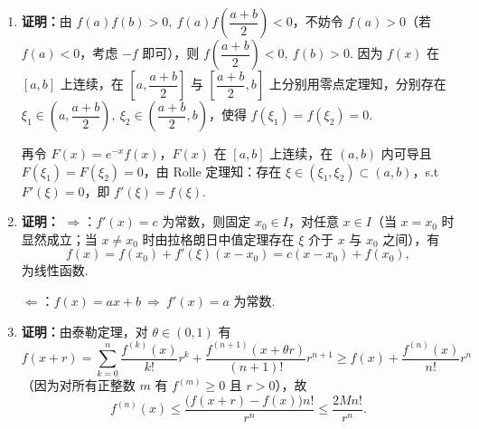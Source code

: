 \documentclass[a4paper,11pt]{ctexart}
\begin{document}
\begin{enumerate}[label=\arabic*., leftmargin=2em, itemsep=0.9em, topsep=0.4em]
  \item \textbf{证明：}由 $f(a)f(b)>0,\ f(a)f\!\left(\dfrac{a+b}{2}\right)<0$，不妨令 $f(a)>0$（若 $f(a)<0$，考虑 $-f$ 即可），则 $f\!\left(\dfrac{a+b}{2}\right)<0,\ f(b)>0$. 因为 $f(x)$ 在 $[a,b]$ 上连续，在 $\left[a,\dfrac{a+b}{2}\right]$ 与 $\left[\dfrac{a+b}{2},b\right]$ 上分别用零点定理知，分别存在 $\xi_1\in\left(a,\dfrac{a+b}{2}\right),\ \xi_2\in\left(\dfrac{a+b}{2},b\right)$，使得 $f(\xi_1)=f(\xi_2)=0$.

  再令 $F(x)=e^{-x}f(x)$，$F(x)$ 在 $[a,b]$ 上连续，在 $(a,b)$ 内可导且 $F(\xi_1)=F(\xi_2)=0$，由 Rolle 定理知：存在 $\xi\in(\xi_1,\xi_2)\subset(a,b)$，s.t\ $F'(\xi)=0$，即 $f'(\xi)=f(\xi)$.

  \item \textbf{证明：}
  $\Rightarrow$：$f'(x)=c$ 为常数，则固定 $x_0\in I$，对任意 $x\in I$（当 $x=x_0$ 时显然成立；当 $x\neq x_0$ 时由拉格朗日中值定理存在 $\xi$ 介于 $x$ 与 $x_0$ 之间），有
  \[
    f(x)=f(x_0)+f'(\xi)(x-x_0)=c(x-x_0)+f(x_0),
  \]
  为线性函数.

  $\Leftarrow$：$f(x)=ax+b\ \Rightarrow\ f'(x)=a$ 为常数.

  \item \textbf{证明：}由泰勒定理，对 $\theta\in(0,1)$ 有
  \[
    f(x+r)=\sum_{k=0}^{n}\frac{f^{(k)}(x)}{k!}r^k+\frac{f^{(n+1)}(x+\theta r)}{(n+1)!}r^{n+1}\ge f(x)+\frac{f^{(n)}(x)}{n!}r^n
  \]
  （因为对所有正整数 $m$ 有 $f^{(m)}\ge 0$ 且 $r>0$），故
  \[
    f^{(n)}(x)\le\frac{\bigl(f(x+r)-f(x)\bigr)n!}{r^n}\le\frac{2Mn!}{r^n}.
  \]
\end{enumerate}
\end{document}
